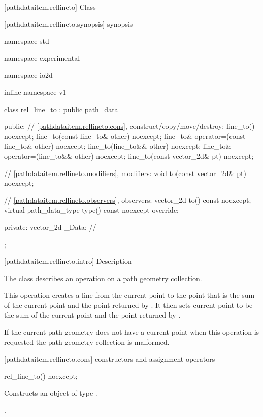  [pathdataitem.rellineto] {Class }

 [pathdataitem.rellineto.synopsis] { synopsis}

\begin{codeblock}
namespace std { namespace experimental { namespace io2d { inline namespace v1 {
  class rel_line_to : public path_data {
  public:
    // \ref{pathdataitem.rellineto.cons}, construct/copy/move/destroy:
    line_to() noexcept;
    line_to(const line_to& other) noexcept;
    line_to& operator=(const line_to& other) noexcept;
    line_to(line_to&& other) noexcept;
    line_to& operator=(line_to&& other) noexcept;
    line_to(const vector_2d& pt) noexcept;

    // \ref{pathdataitem.rellineto.modifiers}, modifiers:
    void to(const vector_2d& pt) noexcept;

    // \ref{pathdataitem.rellineto.observers}, observers:
    vector_2d to() const noexcept;
    virtual path_data_type type() const noexcept override;
    
  private:
    vector_2d _Data; // \expos
  };
} } } }
\end{codeblock}

 [pathdataitem.rellineto.intro] { Description}

\pnum
{}
The class  describes an operation on a path geometry collection.

\pnum
This operation creates a line from the current point to the point that is the sum of the current point and the point returned by . It then sets current point to be the sum of the current point and the point returned by .

\pnum
If the current path geometry does not have a current point when this operation is requested the path geometry collection is malformed.

 [pathdataitem.rellineto.cons] { constructors and assignment operators}

\begin{itemdecl}
    rel_line_to() noexcept;
\end{itemdecl}
\begin{itemdescr}
	\pnum
	\effects
	Constructs an object of type .
	
	\pnum
	\postconditions
	.
\end{itemdescr}

